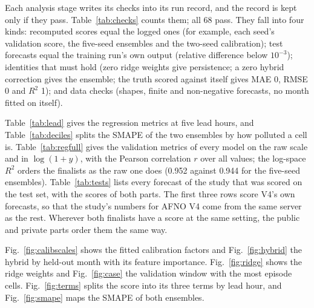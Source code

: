 \documentclass[journal]{IEEEtran}
\begin{document}
Each analysis stage writes its checks into its run record, and the record is kept only if they pass. Table~\ref{tab:checks} counts them; all 68 pass. They fall into four kinds: recomputed scores equal the logged ones (for example, each seed's validation score, the five-seed ensembles and the two-seed calibration); test forecasts equal the training run's own output (relative difference below $10^{-3}$); identities that must hold (zero ridge weights give persistence; a zero hybrid correction gives the ensemble; the truth scored against itself gives MAE 0, RMSE 0 and $R^2$ 1); and data checks (shapes, finite and non-negative forecasts, no month fitted on itself).

Table~\ref{tab:lead} gives the regression metrics at five lead hours, and Table~\ref{tab:deciles} splits the SMAPE of the two ensembles by how polluted a cell is. Table~\ref{tab:regfull} gives the validation metrics of every model on the raw scale and in $\log(1+y)$, with the Pearson correlation $r$ over all values; the log-space $R^2$ orders the finalists as the raw one does (0.952 against 0.944 for the five-seed ensembles). Table~\ref{tab:tests} lists every forecast of the study that was scored on the test set, with the scores of both parts. The first three rows score V4's own forecasts, so that the study's numbers for AFNO V4 come from the same server as the rest. Wherever both finalists have a score at the same setting, the public and private parts order them the same way.

Fig.~\ref{fig:calibscales} shows the fitted calibration factors and Fig.~\ref{fig:hybrid} the hybrid by held-out month with its feature importance. Fig.~\ref{fig:ridge} shows the ridge weights and Fig.~\ref{fig:case} the validation window with the most episode cells. Fig.~\ref{fig:terms} splits the score into its three terms by lead hour, and Fig.~\ref{fig:smape} maps the SMAPE of both ensembles.
\end{document}
